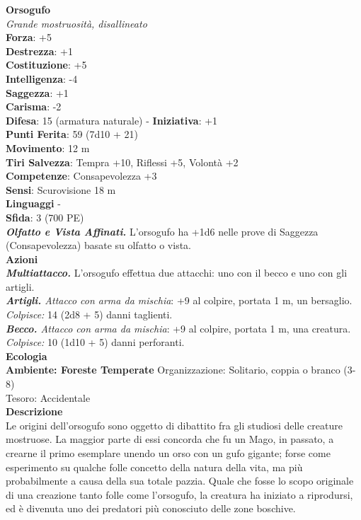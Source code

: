 \begin{multicols}{2}
\medskip\textbf{Orsogufo}\\
\emph{Grande mostruosità, disallineato}\\
\textbf{Forza}: +5\\
\textbf{Destrezza}: +1\\
\textbf{Costituzione}: +5\\
\textbf{Intelligenza}: -4\\
\textbf{Saggezza}: +1\\
\textbf{Carisma}: -2\\
\textbf{Difesa}: 15 (armatura naturale) - \textbf{Iniziativa}: +1\\
\textbf{Punti Ferita}: 59 (7d10 + 21)\\
\textbf{Movimento}: 12 m\\
\textbf{Tiri Salvezza}: Tempra +10, Riflessi +5, Volontà +2\\
\textbf{Competenze}: Consapevolezza +3\\
\textbf{Sensi}: Scurovisione 18 m\\
\textbf{Linguaggi} -\\
\textbf{Sfida}: 3 (700 PE)\smallskip\\
\emph{\textbf{Olfatto e Vista Affinati.}} L'orsogufo ha +1d6 nelle prove di Saggezza (Consapevolezza) basate su olfatto o vista.\\
\smallskip\textbf{Azioni}\\
\emph{\textbf{Multiattacco.}} L'orsogufo effettua due attacchi: uno con il becco e uno con gli artigli.\\
\emph{\textbf{Artigli.} Attacco con arma da mischia}: +9 al colpire, portata 1 m, un bersaglio.\\
\emph{Colpisce:} 14 (2d8 + 5) danni taglienti.\\
\emph{\textbf{Becco.} Attacco con arma da mischia}: +9 al colpire, portata 1 m, una creatura.\\
\emph{Colpisce:} 10 (1d10 + 5) danni perforanti.\\
\textbf{Ecologia}\\
\textbf{Ambiente: Foreste Temperate}
Organizzazione: Solitario, coppia o branco (3-8)\\
Tesoro: Accidentale\\
\textbf{Descrizione}\\
Le origini dell'orsogufo sono oggetto di dibattito fra gli studiosi delle creature mostruose. La maggior parte di essi concorda che fu un Mago, in passato, a crearne il primo esemplare unendo un orso con un gufo gigante; forse come esperimento su qualche folle concetto della natura della vita, ma più probabilmente a causa della sua totale pazzia. Quale che fosse lo scopo originale di una creazione tanto folle come l'orsogufo, la creatura ha iniziato a riprodursi, ed è divenuta uno dei predatori più conosciuto delle zone boschive.\\

\end{multicols}
